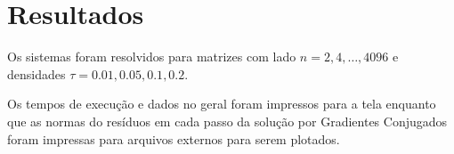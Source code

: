 \documentclass[a4paper,11pt]{article}
\begin{document}
    \section*{Resultados}
        Os sistemas foram resolvidos para matrizes com lado $n = 2, 4, \dots, 4096$ e
        densidades $\tau = 0.01, 0.05, 0.1, 0.2$.

        Os tempos de execução e dados no geral foram impressos para a tela enquanto que as
        normas do resíduos em cada passo da solução por Gradientes Conjugados foram impressas
        para arquivos externos para serem plotados.

\end{document}
